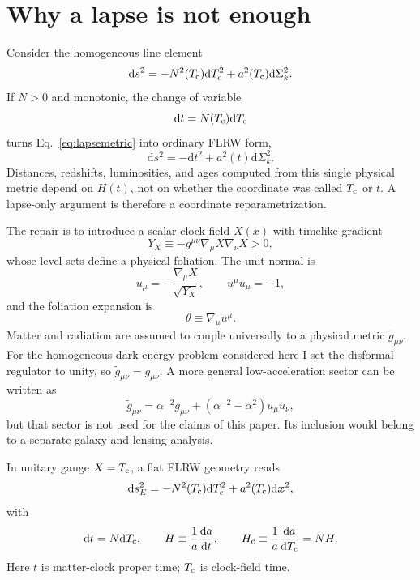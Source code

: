 \documentclass[aps,prd,reprint,nofootinbib,superscriptaddress,longbibliography]{revtex4-2}
\newcommand{\dd}{\mathrm{d}}
\newcommand{\Tc}{T_{\rm c}}
\newcommand{\Hc}{H_{\rm c}}
\newcommand{\gt}{\tilde g}
\begin{document}
\section{Why a lapse is not enough}

Consider the homogeneous line element
\begin{equation}
  \dd s^2=-N^2(\Tc)\dd\Tc^2+a^2(\Tc)\dd\Sigma_k^2 .
  \label{eq:lapsemetric}
\end{equation}
If $N>0$ and monotonic, the change of variable
\begin{equation}
  \dd t=N(\Tc)\dd\Tc
  \label{eq:timechange}
\end{equation}
turns Eq.~\eqref{eq:lapsemetric} into ordinary FLRW form,
\begin{equation}
  \dd s^2=-\dd t^2+a^2(t)\dd\Sigma_k^2 .
\end{equation}
Distances, redshifts, luminosities, and ages computed from this single physical metric depend on $H(t)$, not on whether the coordinate was called $\Tc$ or $t$.  A lapse-only argument is therefore a coordinate reparametrization.

The repair is to introduce a scalar clock field $X(x)$ with timelike gradient
\begin{equation}
  Y_X\equiv -g^{\mu\nu}\nabla_\mu X\nabla_\nu X>0,
\end{equation}
whose level sets define a physical foliation.  The unit normal is
\begin{equation}
  u_\mu=-\frac{\nabla_\mu X}{\sqrt{Y_X}},\qquad u^\mu u_\mu=-1,
\end{equation}
and the foliation expansion is
\begin{equation}
  \theta\equiv \nabla_\mu u^\mu .
\end{equation}
Matter and radiation are assumed to couple universally to a physical metric $\gt_{\mu\nu}$.  For the homogeneous dark-energy problem considered here I set the disformal regulator to unity, so $\gt_{\mu\nu}=g_{\mu\nu}$.  A more general low-acceleration sector can be written as
\begin{equation}
  \gt_{\mu\nu}=\alpha^{-2}g_{\mu\nu}+(\alpha^{-2}-\alpha^2)u_\mu u_\nu,
  \label{eq:physicalmetric}
\end{equation}
but that sector is not used for the claims of this paper.  Its inclusion would belong to a separate galaxy and lensing analysis.

In unitary gauge $X=\Tc$, a flat FLRW geometry reads
\begin{equation}
  \dd s_E^2=-N^2(\Tc)\dd\Tc^2+a^2(\Tc)\dd\bm{x}^2,
\end{equation}
with
\begin{equation}
  \dd t=N\dd\Tc,
  \qquad
  H\equiv \frac{1}{a}\frac{\dd a}{\dd t},
  \qquad
  \Hc\equiv \frac{1}{a}\frac{\dd a}{\dd\Tc}=NH .
  \label{eq:Hdefinitions}
\end{equation}
Here $t$ is matter-clock proper time; $\Tc$ is clock-field time.
\end{document}

